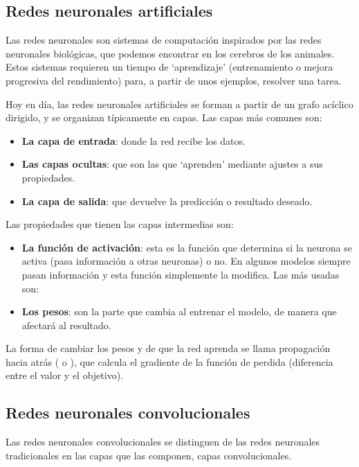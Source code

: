 \subsection{Redes neuronales artificiales}

Las redes neuronales son sistemas de computación inspirados por las redes neuronales biológicas, que podemos encontrar en los cerebros de los animales. Estos sistemas requieren un tiempo de `aprendizaje' (entrenamiento o mejora progresiva del rendimiento) para, a partir de unos ejemplos, resolver una tarea.

Hoy en día, las redes neuronales artificiales se forman a partir de un grafo acíclico dirigido, y se organizan típicamente en capas. Las capas más comunes son: 
\begin{itemize}
\item \textbf{La capa de entrada}: donde la red recibe los datos.
\item \textbf{Las capas ocultas}: que son las que `aprenden' mediante ajustes a sus propiedades.
\item \textbf{La capa de salida}: que devuelve la predicción o resultado deseado.
\end{itemize}

Las propiedades que tienen las capas intermedias son:

\begin{itemize}
\item \textbf{La función de activación}: esta es la función que determina si la neurona se activa (pasa información a otras neuronas) o no. En algunos modelos siempre pasan información y esta función simplemente la modifica. Las más usadas son: 
\item \textbf{Los pesos}: son la parte que cambia al entrenar el modelo, de manera que afectará al resultado.
\end{itemize}

La forma de cambiar los pesos y de que la red aprenda se llama propagación hacia atrás ( o ), que calcula el gradiente de la función de perdida (diferencia entre el valor y el objetivo). 

\subsection{Redes neuronales convolucionales}
Las redes neuronales convolucionales se distinguen de las redes neuronales tradicionales en las capas que las componen, capas convolucionales.

